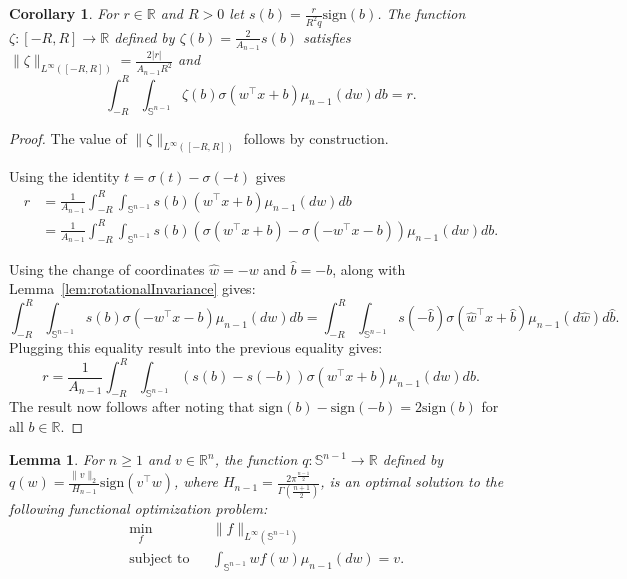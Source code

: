 \documentclass[twoside]{article}
\newtheorem{lemma}{Lemma}
\newtheorem{corollary}{Corollary}
\theoremstyle{definition}
\newcommand{\R}{\mathbb{R}}
\renewcommand{\S}{\mathbb{S}}
\newcommand{\sign}{\mathrm{sign}}
\newcommand{\1}[1]{\scalebox{1.25}{$\mathds{1}$}\left[#1\right]}
\begin{document}
\begin{corollary}
\label{cor:constRep}
    For $r\in \R$ and $R>0$ let $s(b)=\frac{r}{R^2
    q}\sign(b)$. The function $\zeta:[-R,R]\to \R$ defined by 
    $\zeta(b)=\frac{2}{A_{n-1}}s(b)$ satisfies $\|\zeta\|_{L^{\infty}([-R,R])}=\frac{2|r|}{A_{n-1}R^2}$ and
    $$
    \int_{-R}^R\int_{\S^{n-1}}\zeta(b)\sigma(w^\top x+b)\mu_{n-1}(dw)db = r. 
    $$
\end{corollary}

\begin{proof}
The value of $\|\zeta\|_{L^{\infty}([-R,R])}$ follows by construction. 

Using the identity $t=\sigma(t)-\sigma(-t)$ gives
\begin{align*}
r&=\frac{1}{A_{n-1}}\int_{-R}^R\int_{\S^{n-1}}s(b)(w^\top x+b)\mu_{n-1}(dw)db \\
&=\frac{1}{A_{n-1}}\int_{-R}^R\int_{\S^{n-1}}s(b)\left(\sigma(w^\top x+b)-\sigma(-w^\top x -b)\right)\mu_{n-1}(dw)db.
\end{align*}

Using the change of coordinates $\hat w=-w$ and $\hat b=-b$, along with Lemma~\ref{lem:rotationalInvariance} gives:
\begin{equation*}
\int_{-R}^R\int_{\S^{n-1}}s(b)\sigma(-w^\top x -b)\mu_{n-1}(dw)db
=\int_{-R}^R\int_{\S^{n-1}}s(-\hat b)\sigma(\hat w^\top x +\hat b)\mu_{n-1}(d\hat w)d\hat b.
\end{equation*}
Plugging this equality result into the previous equality gives:
\begin{equation*}
r=\frac{1}{A_{n-1}}\int_{-R}^R\int_{\S^{n-1}}\left(s(b)-s(-b)\right)\sigma(w^\top x+b)\mu_{n-1}(dw)db.
\end{equation*}
The result now follows after noting that $\sign(b)-\sign(-b)=2\sign(b)$ for all $b\in\R$.
\end{proof}



\begin{lemma}
\label{lem:optLinear}
For $n\ge 1$ and $v\in \R^n$,
the function $q:\S^{n-1}\to \R$ defined by $q(w)=\frac{\|v\|_2}{H_{n-1}}\sign(v^\top w)$, where $H_{n-1}=\frac{2\pi^{\frac{n-1}{2}}}{\Gamma\left(\frac{n+1}{2}\right)}$, is an optimal solution to the following functional optimization problem:
\begin{align*}
&\min_f && \|f\|_{L^{\infty}(\S^{n-1})}\\
&\textrm{subject to} && \int_{\S^{n-1}}w f(w)\mu_{n-1}(dw)=v.
\end{align*}
\end{lemma}
\end{document}
